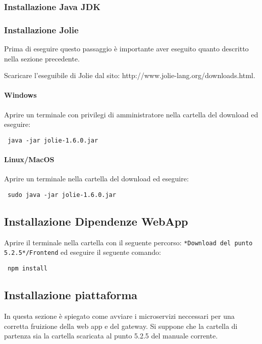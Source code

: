 \subsubsection{Installazione Java JDK}

\subsubsection{Installazione Jolie}
Prima di eseguire questo passaggio è importante aver eseguito quanto descritto nella sezione precedente.

Scaricare l’eseguibile di Jolie dal sito: http://www.jolie-lang.org/downloads.html. 
\paragraph{Windows}
Aprire un terminale con privilegi di amministratore nella cartella del download ed eseguire:
	\begin{center}
	 \verb| java -jar jolie-1.6.0.jar|
	\end{center}
\paragraph{Linux/MacOS}
Aprire un terminale nella cartella del download ed eseguire:
	\begin{center}
	 \verb| sudo java -jar jolie-1.6.0.jar|
	\end{center}
\subsection{Installazione Dipendenze WebApp}
Aprire il terminale nella cartella con il seguente percorso: \verb|*Download del punto 5.2.5*/Frontend| ed eseguire il seguente comando:
	\begin{center}
	\verb| npm install|
\end{center}


\subsection{Installazione piattaforma}
In questa sezione è spiegato come avviare i microservizi neccessari per una corretta fruizione della web app e del gateway. Si suppone che la cartella di partenza sia la cartella scaricata al punto 5.2.5 del manuale corrente.
